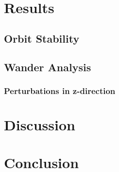 \documentclass[11pt, a4paper,twocolumn]{article} %
\begin{document}
\section{Results}
\subsection{Orbit Stability}
\subsection{Wander Analysis}
\subsubsection{Perturbations in z-direction}

\section{Discussion}
\section{Conclusion}



\printbibliography
\end{document}
